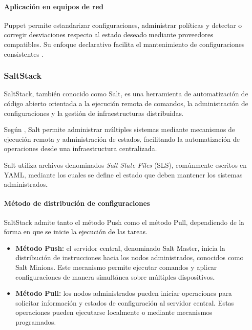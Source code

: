\documentclass[12pt,a4paper]{article}
\begin{document}
\paragraph{Aplicación en equipos de red}

Puppet permite estandarizar configuraciones, administrar políticas y detectar o corregir desviaciones respecto al estado deseado mediante proveedores compatibles. Su enfoque declarativo facilita el mantenimiento de configuraciones consistentes \parencite{puppet_documentation}.



\subsubsection{SaltStack}
\label{sec:saltstack}

SaltStack, también conocido como Salt, es una herramienta
de automatización de código abierto orientada a la ejecución
remota de comandos, la administración de configuraciones y
la gestión de infraestructuras distribuidas.

Según \textcite{myers2015saltstack}, Salt permite administrar
múltiples sistemas mediante mecanismos de ejecución remota
y administración de estados, facilitando la automatización
de operaciones desde una infraestructura centralizada.

Salt utiliza archivos denominados \textit{Salt State Files}
(SLS), comúnmente escritos en YAML, mediante los cuales se
define el estado que deben mantener los sistemas administrados.


\paragraph{Método de distribución de configuraciones}

SaltStack admite tanto el método Push como el método Pull,
dependiendo de la forma en que se inicie la ejecución de
las tareas.

\begin{itemize}

    \item \textbf{Método Push:} el servidor central, denominado
    Salt Master, inicia la distribución de instrucciones hacia
    los nodos administrados, conocidos como Salt Minions.
    Este mecanismo permite ejecutar comandos y aplicar
    configuraciones de manera simultánea sobre múltiples
    dispositivos.

    \item \textbf{Método Pull:} los nodos administrados pueden
    iniciar operaciones para solicitar información y estados
    de configuración al servidor central. Estas operaciones
    pueden ejecutarse localmente o mediante mecanismos
    programados.

\end{itemize}
\end{document}
